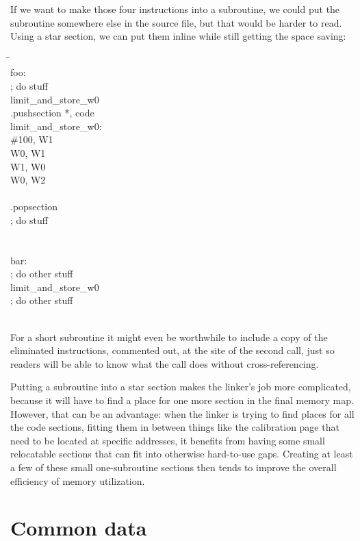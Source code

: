 If we want to make those four instructions into a subroutine, we could put
the subroutine somewhere else in the source file, but that would be harder
to read.  Using a star section, we can put them inline while still getting
the space saving:
\begin{tabbing}
\qquad\=\qquad\qquad\=\kill
\\
foo:\\
\>; do stuff\\
\>\>limit\_and\_store\_w0\\
.pushsection *, code\\
limit\_and\_store\_w0:\\
\>\>\#100, W1\\
\>\>W0, W1\\
\>\>W1, W0\\
\>\>W0, W2\\
\>\\
.popsection\\
\>; do stuff\\
\>\\
\\
bar:\\
\>; do other stuff\\
\>\>limit\_and\_store\_w0\\
\>; do other stuff\\
\>\\
\end{tabbing}

For a short subroutine it might even be worthwhile to include a copy of the
eliminated instructions, commented out, at the site of the second call, just
so readers will be able to know what the call does without
cross-referencing.

Putting a subroutine into a star section makes the linker's job more
complicated, because it will have to find a place for one more section in
the final memory map.  However, that can be an advantage: when the linker is
trying to find places for all the code sections, fitting them in between
things like the calibration page that need to be located at specific
addresses, it benefits from having some small relocatable sections that can
fit into otherwise hard-to-use gaps.  Creating at least a few of these small
one-subroutine sections then tends to improve the overall efficiency of
memory utilization.

\section{Common data}

